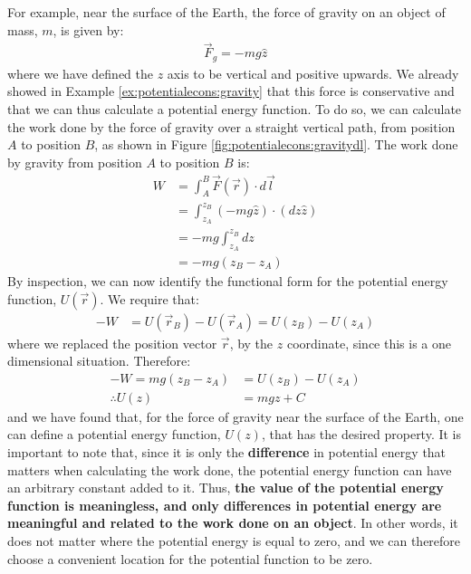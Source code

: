 For example, near the surface of the Earth, the force of gravity on an object of mass, $m$, is given by:
\begin{align*}
\vec F_g = -mg \hat z
\end{align*}
where we have defined the $z$ axis to be vertical and positive upwards. We already showed in Example \ref{ex:potentialecons:gravity} that this force is conservative and that we can thus calculate a potential energy function. To do so, we can calculate the work done by the force of gravity over a straight vertical path, from position $A$ to position $B$, as shown in Figure \ref{fig:potentialecons:gravitydl}.
The work done by gravity from position $A$ to position $B$ is:
\begin{align*}
W &= \int_A^B \vec F(\vec r) \cdot d\vec l\\
&= \int_{z_A}^{z_B} ( -mg \hat z) \cdot (dz \hat z) \\
&= -mg \int_{z_A}^{z_B} dz\\
&= -mg(z_B-z_A) 
\end{align*} 
By inspection, we can now identify the functional form for the potential energy function, $U(\vec r)$. We require that:
\begin{align*}
-W &= U(\vec r_B) - U(\vec r_A) = U(z_B) - U(z_A)
\end{align*}
where we replaced the position vector $\vec r$, by the $z$ coordinate, since this is a one dimensional situation. Therefore:
\begin{align*}
-W=mg(z_B-z_A)&= U(z_B) - U(z_A)\\
\therefore U(z) &= mgz + C
\end{align*} 
and we have found that, for the force of gravity near the surface of the Earth, one can define a potential energy function, $U(z)$, that has the desired property. It is important to note that, since it is only the \textbf{difference} in potential energy that matters when calculating the work done, the potential energy function can have an arbitrary constant added to it. Thus, \textbf{the value of the potential energy function is meaningless, and only differences in potential energy are meaningful and related to the work done on an object}. In other words, it does not matter where the potential energy is equal to zero, and we can therefore choose a convenient location for the potential function to be zero.

